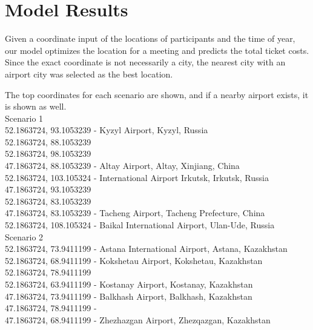 \section{Model Results}
	Given a coordinate input of the locations of participants and the time of year, our model optimizes the location for a meeting and predicts the total ticket costs. Since the exact coordinate is not necessarily a city, the nearest city with an airport city was selected as the best location. 

The top coordinates for each scenario are shown, and if a nearby airport exists, it is shown as well.\\


Scenario 1\\
52.1863724, 93.1053239 - Kyzyl Airport, Kyzyl, Russia\\
52.1863724, 88.1053239\\
52.1863724, 98.1053239\\
47.1863724, 88.1053239 - Altay Airport, Altay, Xinjiang, China\\
52.1863724, 103.105324 - International Airport Irkutsk, Irkutsk, Russia\\
47.1863724, 93.1053239\\
52.1863724, 83.1053239\\
47.1863724, 83.1053239 - Tacheng Airport, Tacheng Prefecture, China\\
52.1863724, 108.105324 - Baikal International Airport, Ulan-Ude, Russia\\

Scenario 2\\
52.1863724, 73.9411199 - Astana International Airport, Astana, Kazakhstan\\
52.1863724, 68.9411199 - Kokshetau Airport, Kokshetau, Kazakhstan\\
52.1863724, 78.9411199\\
52.1863724, 63.9411199 - Kostanay Airport, Kostanay, Kazakhstan\\
47.1863724, 73.9411199 - Balkhash Airport, Balkhash, Kazakhstan\\
47.1863724, 78.9411199 - \\
47.1863724, 68.9411199 - Zhezhazgan Airport, Zhezqazgan, Kazakhstan\\

